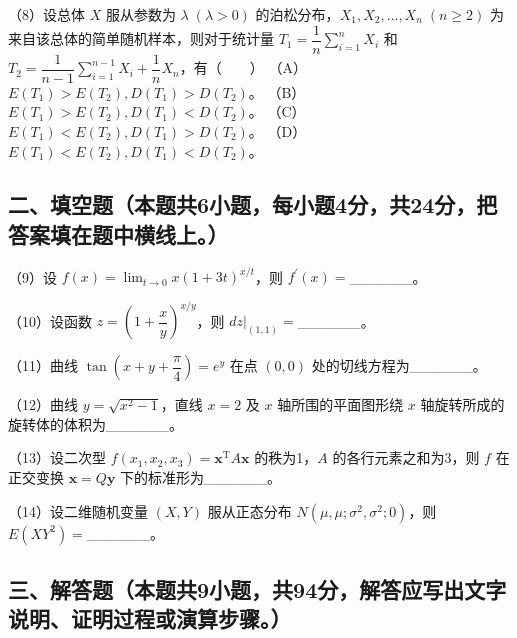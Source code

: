 \documentclass[UTF8,12pt]{ctexart}
\begin{document}
（8）设总体 \(\displaystyle X\) 服从参数为 \(\displaystyle \lambda\;(\lambda>0)\) 的泊松分布，\(\displaystyle X_1,\allowbreak X_2,\allowbreak \ldots,\allowbreak X_n\;(n\ge2)\) 为来自该总体的简单随机样本，则对于统计量 \(\displaystyle T_1=\dfrac{\displaystyle 1}{\displaystyle n}\displaystyle \sum_{i=1}^{n}X_i\) 和 \(\displaystyle T_2=\dfrac{\displaystyle 1}{\displaystyle n-1}\displaystyle \sum_{i=1}^{n-1}X_i+\dfrac{\displaystyle 1}{\displaystyle n}X_n\)，有（　　）
（A）\(\displaystyle E(T_1)>E(T_2),\allowbreak D(T_1)>D(T_2)\)。 （B）\(\displaystyle E(T_1)>E(T_2),\allowbreak D(T_1)<D(T_2)\)。
（C）\(\displaystyle E(T_1)<E(T_2),\allowbreak D(T_1)>D(T_2)\)。 （D）\(\displaystyle E(T_1)<E(T_2),\allowbreak D(T_1)<D(T_2)\)。


\subsection*{二、填空题（本题共6小题，每小题4分，共24分，把答案填在题中横线上。）}

（9）设 \(\displaystyle f(x)=\displaystyle \lim_{t\to0}x(1+3t)^{x/t}\)，则 \(\displaystyle f^{\prime}(x)=\)\_\_\_\_\_\_。


（10）设函数 \(\displaystyle z=\left(1+\dfrac{\displaystyle x}{\displaystyle y}\right)^{x/y}\)，则 \(\displaystyle dz\big|_{(1,\allowbreak 1)}=\)\_\_\_\_\_\_。


（11）曲线 \(\displaystyle \tan\left(x+y+\dfrac{\displaystyle \pi}{\displaystyle 4}\right)=e^y\) 在点 \(\displaystyle (0,\allowbreak 0)\) 处的切线方程为\_\_\_\_\_\_。


（12）曲线 \(\displaystyle y=\sqrt{x^2-1}\)，直线 \(\displaystyle x=2\) 及 \(\displaystyle x\) 轴所围的平面图形绕 \(\displaystyle x\) 轴旋转所成的旋转体的体积为\_\_\_\_\_\_。


（13）设二次型 \(\displaystyle f(x_1,\allowbreak x_2,\allowbreak x_3)=\boldsymbol x^{\mathrm T}A\boldsymbol x\) 的秩为1，\(\displaystyle A\) 的各行元素之和为3，则 \(\displaystyle f\) 在正交变换 \(\displaystyle \boldsymbol x=Q\boldsymbol y\) 下的标准形为\_\_\_\_\_\_。


（14）设二维随机变量 \(\displaystyle (X,\allowbreak Y)\) 服从正态分布 \(\displaystyle N(\mu,\allowbreak \mu;\sigma^2,\allowbreak \sigma^2;0)\)，则 \(\displaystyle E(XY^2)=\)\_\_\_\_\_\_。


\subsection*{三、解答题（本题共9小题，共94分，解答应写出文字说明、证明过程或演算步骤。）}
\end{document}
